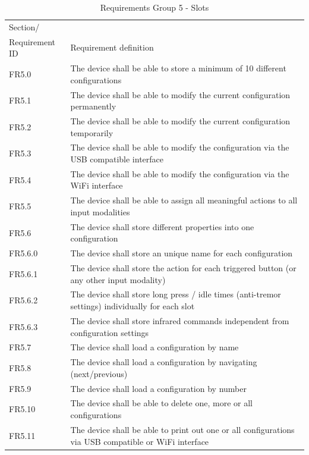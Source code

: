 \documentclass[]{scrreprt}%
\begin{document}
\begin{table}[htb!]
 \centering
 \caption{Requirements Group 5 - Slots}
\label{req_group5}
 \begin{tabularx}{\textwidth}{|l|X|} \hline
 Section/\\ Requirement ID & Requirement definition\\ \hline  \hline
 FR5.0 & The device shall be able to store a minimum of 10 different configurations  \\ \hline
 FR5.1 & The device shall be able to modify the current configuration permanently \\ \hline
 FR5.2 & The device shall be able to modify the current configuration temporarily \\ \hline
 FR5.3 & The device shall be able to modify the configuration via the USB compatible interface \\ \hline
 FR5.4 & The device shall be able to modify the configuration via the WiFi interface  \\ \hline
 FR5.5 & The device shall be able to assign all meaningful actions to all input modalities  \\ \hline
 FR5.6 & The device shall store different properties into one configuration  \\ \hline
 FR5.6.0 & The device shall store an unique name for each configuration  \\ \hline
 FR5.6.1 & The device shall store the action for each triggered button (or any other input modality)  \\ \hline
 FR5.6.2 & The device shall store long press / idle times (anti-tremor settings) individually for each slot \\ \hline
 FR5.6.3 & The device shall store infrared commands independent from configuration settings \\ \hline
 FR5.7 & The device shall load a configuration by name  \\ \hline
 FR5.8 & The device shall load a configuration by navigating (next/previous)  \\ \hline
 FR5.9 & The device shall load a configuration by number  \\ \hline
 FR5.10 & The device shall be able to delete one, more or all configurations \\ \hline
 FR5.11 & The device shall be able to print out one or all configurations via USB compatible or WiFi interface \\ \hline
 \end{tabularx}
\end{table}
\end{document}
